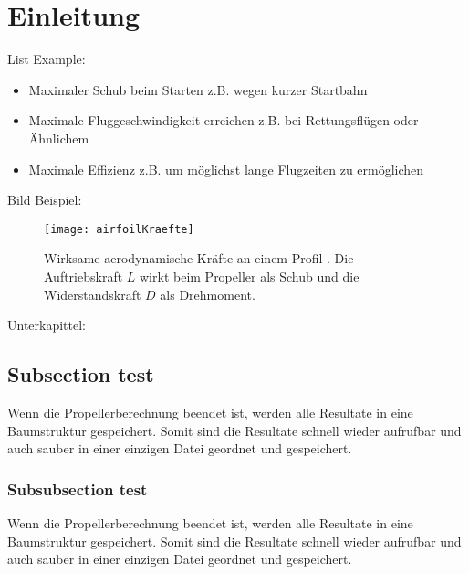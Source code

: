 \section{Einleitung}
\label{sec:einleitung}

List Example:
\begin{itemize}
\item Maximaler Schub beim Starten z.B. wegen kurzer Startbahn
\item Maximale Fluggeschwindigkeit erreichen z.B. bei Rettungsflügen oder Ähnlichem
\item Maximale Effizienz z.B. um möglichst lange Flugzeiten zu ermöglichen
\end{itemize}



Bild Beispiel:
\vspace{0.05cm}

\begin{figure}[htb!]
	\begin{center}
		\texttt{[image: airfoilKraefte]}
		\caption[Wirksame aerodynamische Kräfte an einem Profil]{Wirksame aerodynamische Kräfte an einem Profil \cite{aeroKraefte}. Die Auftriebskraft $L$ wirkt beim Propeller als Schub und die Widerstandskraft $D$ als Drehmoment.}
		\label{fig:airfoilKraefte}
	\end{center}
\end{figure}

\vspace{0.05cm}

Unterkapittel:

\subsection{Subsection test}
\label{subsec:speichernderresultatematlab}

Wenn die Propellerberechnung beendet ist, werden alle Resultate in eine Baumstruktur gespeichert. Somit sind die Resultate schnell wieder aufrufbar und auch sauber in einer einzigen Datei geordnet und gespeichert.\\

\subsubsection{Subsubsection test}
\label{subsubsec:speichernderresultatematla2}

Wenn die Propellerberechnung beendet ist, werden alle Resultate in eine Baumstruktur gespeichert. Somit sind die Resultate schnell wieder aufrufbar und auch sauber in einer einzigen Datei geordnet und gespeichert.\\


